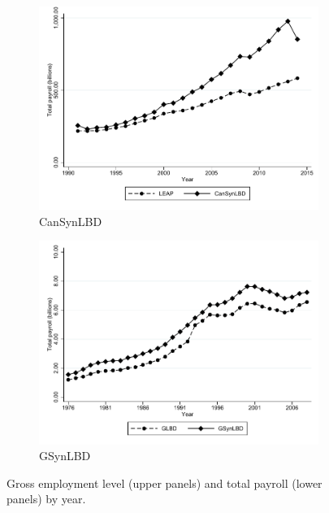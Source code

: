 \begin{figure}[t]
\begin{subfigure}[h]{0.48\linewidth}
\includegraphics[trim=0 0 0 -20,clip,width=\linewidth]{graphs/Total_payroll_by_year_private_bw.pdf}
\caption{CanSynLBD}
\end{subfigure}
\hfill
\begin{subfigure}[h]{0.48\linewidth}
\includegraphics[trim=0 0 0 -20,clip,width=\linewidth]{graphs/Total_payroll_by_year_bw_GsynLBD.pdf}
\caption{GSynLBD}
\end{subfigure}%
\caption{Gross employment level (upper panels) and total payroll (lower panels) by year.}\label{fig:entity_chracteristics}
\end{figure}
